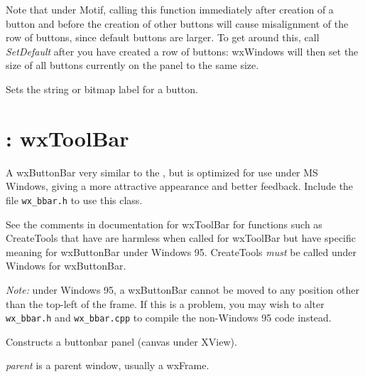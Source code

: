 Note that under Motif, calling this function immediately after
creation of a button and before the creation of other buttons
will cause misalignment of the row of buttons, since default
buttons are larger. To get around this, call {\it SetDefault}\rtfsp
after you have created a row of buttons: wxWindows will
then set the size of all buttons currently on the panel to
the same size.

\label{wxbuttonsetlabel}



Sets the string or bitmap label for a button.

\section{: wxToolBar}\label{wxbuttonbar}


A wxButtonBar very similar to the , but
is optimized for use under MS Windows, giving a more attractive appearance
and better feedback. Include the file {\tt wx\_bbar.h} to use this class.

See the comments in documentation for wxToolBar for functions such as
CreateTools that have are harmless when called for wxToolBar
but have specific meaning for wxButtonBar under Windows 95. CreateTools\rtfsp
{\it must} be called under Windows for wxButtonBar.

{\it Note:} under Windows 95, a wxButtonBar cannot be moved to any
position other than the top-left of the frame. If this is a problem, you may
wish to alter {\tt wx\_bbar.h} and {\tt wx\_bbar.cpp} to compile the non-Windows 95
code instead.



Constructs a buttonbar panel (canvas under XView).

{\it parent} is a parent window, usually a wxFrame.


